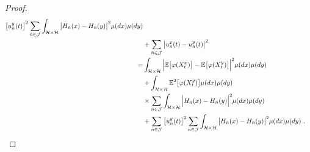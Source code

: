 \documentclass[review,onefignum,onetabnum]{siamart190516}
\begin{document}
\begin{proof}
\begin{equation}
\begin{aligned}
            \big[
                u_{\bar n}^y(t)
            \big] ^ 2
            \sum_{\bar n\in \mathcal{J}}
            \int_{\mathcal{H}\times \mathcal{H}}
            \big|
                H_{\bar n}(x) -H_{\bar n}(y)
            \big|^2 \mu(dx) \mu(dy)
            \\
            &+
            \sum_{\bar n\in \mathcal{J}}
                        \big|
                            u_{\bar n}^x(t)-u_{\bar n}^y(t)
                        \big| ^ 2
            \\
            =&
            \int_{\mathcal{H}\times \mathcal{H}}
            \Big|
                \mathbb{E}\big[
                    \varphi(X_t^x)
                \big]
                -
                \mathbb{E}\big[
                    \varphi(X_t^y)
                \big]
            \Big|^2
            \mu(dx)\mu(dy)
            \\
            &+
            \int_{\mathcal{H}\times \mathcal{H}}
            \mathbb{E} ^ 2\big[
                \varphi(X_t^y)
            \big] \mu(dx) \mu(dy)
            \\
            & \times
            \sum_{\bar n\in \mathcal{J}}
            \int_{\mathcal{H}\times \mathcal{H}}
            \Big|
                H_{\bar n}(x) - H_{\bar n}(y)
            \Big|^2  \mu(dx)\mu(dy)
            \\
            &+
            \sum_{\bar n\in \mathcal{J}}
            \big[
                u_{\bar n}^y(t)
            \big]^2
            \sum_{\bar n\in \mathcal{J}}
            \int_{\mathcal{H}\times \mathcal{H}}
            \big|
                H_{\bar n}(x) - H_{\bar n}(y)
            \big|^2 \mu(dx)\mu(dy)
            \ .
    \end{aligned}
\end{equation}


\end{proof}
\end{document}
